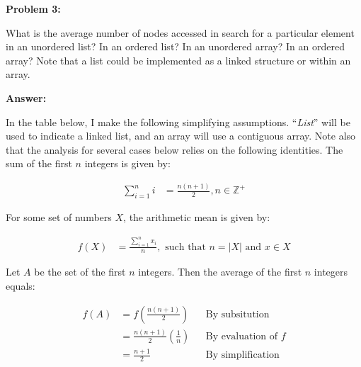\documentclass[10pt,letterpaper,final]{report}
\begin{document}
\pagebreak

\noindent\textbf{Problem 3:}

What is the average number of nodes accessed in search for a particular element in an unordered list? In an ordered list? In an unordered array? In an ordered array? Note that a list could be implemented as a linked structure or within an array.

\medskip
\noindent\textbf{Answer:}

In the table below, I make the following simplifying assumptions. ``\emph{List}'' will be used to indicate a linked list, and an array will use a contiguous array. Note also that the analysis for several cases below relies on the following identities. The sum of the first $n$ integers is given by:

\begin{align*}
  \sum_{i=1}^{n} i & = \frac{n(n+1)}{2}, n \in \mathbb{Z^+} \tag{Sum of First n Integers}
\end{align*}

For some set of numbers $X$, the arithmetic mean is given by:

\begin{align*}
  f(X) & = \frac{\sum_{i=1}^{n} x_i}{n}, \text{ such that } n = |X| \text{ and } x \in X \tag{Arithmetic Mean or Average}
\end{align*}

Let $A$ be the set of the first $n$ integers. Then the average of the first $n$ integers equals:

\begin{align*}
  f(A) & = f\left(\frac{n(n+1)}{2}\right)           &  & \text{By subsitution}       \\
       & = \frac{n(n+1)}{2}\left(\frac{1}{n}\right) &  & \text{By evaluation of $f$} \\
       & = \frac{n+1}{2}                            &  & \text{By simplification}    \\
\end{align*}
\end{document}
